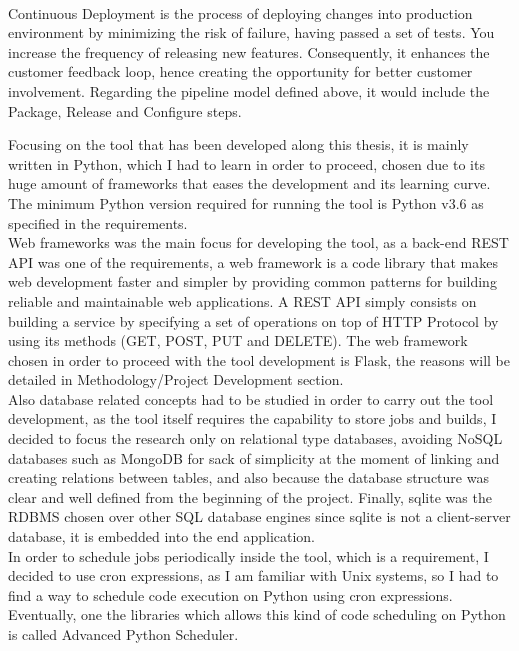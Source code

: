\documentclass{article}
\begin{document}
\vspace{5px}
~\\
Continuous Deployment is the process of deploying changes into production environment by minimizing the risk of failure, having passed a set of tests. You increase the frequency of releasing new features. Consequently, it enhances the customer feedback loop, hence creating the opportunity for better customer involvement. Regarding the pipeline model defined above, it would include the Package, Release and Configure steps.

\newpage
\noindent
Focusing on the tool that has been developed along this thesis, it is mainly written in Python, which I had to learn in order to proceed, chosen due to its huge amount of frameworks that eases the development and its learning curve. The minimum Python version required for running the tool is Python v3.6 as specified in the requirements. 
~\\

Web frameworks was the main focus for developing the tool, as a back-end REST API was one of the requirements, a web framework is a code library that makes web development faster and simpler by providing common patterns for building reliable and maintainable web applications. A REST API simply consists on building a service by specifying a set of operations on top of HTTP Protocol by using its methods (GET, POST, PUT and DELETE). The web framework chosen in order to proceed with the tool development is Flask, the reasons will be detailed in Methodology/Project Development section.
~\\

Also database related concepts had to be studied in order to carry out the tool development, as the tool itself requires the capability to store jobs and builds, I decided to focus the research only on relational type databases, avoiding NoSQL databases such as MongoDB for sack of simplicity at the moment of linking and creating relations between tables, and also because the database structure was clear and well defined from the beginning of the project. Finally, sqlite was the \gls{RDBMS} chosen over other SQL database engines since sqlite is not a client-server database, it is embedded into the end application.
~\\

In order to schedule jobs periodically inside the tool, which is a requirement, I decided to use cron expressions, as I am familiar with Unix systems, so I had to find a way to schedule code execution on Python using cron expressions. Eventually, one the libraries which allows this kind of code scheduling on Python is called Advanced Python Scheduler. 
~\\ 
\end{document}
